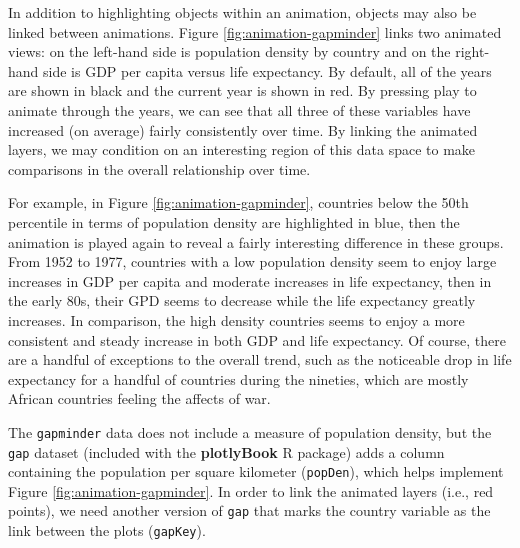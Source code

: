 \documentclass[
  12pt,
]{krantz}
\begin{document}
In addition to highlighting objects within an animation, objects may also be linked between animations. Figure \ref{fig:animation-gapminder} links two animated views: on the left-hand side is population density by country and on the right-hand side is GDP per capita versus life expectancy. By default, all of the years are shown in black and the current year is shown in red. By pressing play to animate through the years, we can see that all three of these variables have increased (on average) fairly consistently over time. By linking the animated layers, we may condition on an interesting region of this data space to make comparisons in the overall relationship over time.

For example, in Figure \ref{fig:animation-gapminder}, countries below the 50th percentile in terms of population density are highlighted in blue, then the animation is played again to reveal a fairly interesting difference in these groups. From 1952 to 1977, countries with a low population density seem to enjoy large increases in GDP per capita and moderate increases in life expectancy, then in the early 80s, their GPD seems to decrease while the life expectancy greatly increases. In comparison, the high density countries seems to enjoy a more consistent and steady increase in both GDP and life expectancy. Of course, there are a handful of exceptions to the overall trend, such as the noticeable drop in life expectancy for a handful of countries during the nineties, which are mostly African countries feeling the affects of war.

The \texttt{gapminder} data does not include a measure of population density, but the \texttt{gap} dataset (included with the \textbf{plotlyBook} R package) adds a column containing the population per square kilometer (\texttt{popDen}), which helps implement Figure \ref{fig:animation-gapminder}. In order to link the animated layers (i.e., red points), we need another version of \texttt{gap} that marks the country variable as the link between the plots (\texttt{gapKey}).
\end{document}
